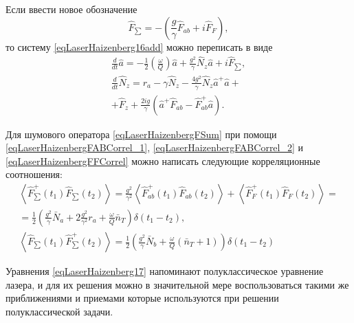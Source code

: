 Если ввести новое обозначение 
\begin{equation}
\hat{F}_{\sum} = - \left(\frac{g}{\gamma}\hat{F}_{ab} + i \hat{F}_F\right),
\label{eqLaserHaizenbergFSum}
\end{equation}
то систему 
\eqref{eqLaserHaizenberg16add} можно переписать в виде
\begin{eqnarray}
\frac{d}{dt} \hat{a} = -
\frac{1}{2}\left(\frac{\omega}{Q}\right)\hat{a} + \frac{g^2}{\gamma}
\hat{N}_z\hat{a} + i \hat{F}_{\sum},
\nonumber \\
\frac{d}{dt}\hat{N}_z = r_a -
\gamma\hat{N}_z - \frac{4g^2}{\gamma}
\hat{N}_z\hat{a}^{+}\hat{a} +
\nonumber \\
+ \hat{F}_z + \frac{2ig}{\gamma} \left(\hat{a}^{+}\hat{F}_{ab} -
\hat{F}_{ab}^{+}\hat{a}\right).
\label{eqLaserHaizenberg17}
\end{eqnarray}

Для шумового оператора \eqref{eqLaserHaizenbergFSum} при помощи
\eqref{eqLaserHaizenbergFABCorrel_1},
\eqref{eqLaserHaizenbergFABCorrel_2} и
\eqref{eqLaserHaizenbergFFCorrel} 
можно написать следующие корреляционные соотношения:
\begin{eqnarray}
\left<\hat{F}^{+}_{\sum}\left(t_1\right)\hat{F}_{\sum}\left(t_2\right)\right>
=
\frac{g^2}{\gamma^2}\left<\hat{F}^{+}_{ab}\left(t_1\right)\hat{F}_{ab}\left(t_2\right)\right>
+
\left<\hat{F}^{+}_{F}\left(t_1\right)\hat{F}_{F}\left(t_2\right)\right>
= 
\nonumber \\
= 
\frac{1}{2}
\left(
\frac{g^2}{\gamma}\bar{N}_a + 2 \frac{g^2}{\gamma^2}r_a + 
\frac{\omega}{Q}\bar{n}_T
\right)
\delta\left(t_1 - t_2\right),
\nonumber \\
\left<\hat{F}_{\sum}\left(t_1\right)\hat{F}^{+}_{\sum}\left(t_2\right)\right>
= \frac{1}{2}
\left(
\frac{g^2}{\gamma}\bar{N}_b + 
\frac{\omega}{Q}\left(\bar{n}_T + 1\right)
\right)
\delta\left(t_1 - t_2\right)
\label{eqLaserHaizenbergFSumCorrel}
\end{eqnarray}


Уравнения \eqref{eqLaserHaizenberg17} напоминают полуклассическое
уравнение лазера, и для их решения можно в значительной мере
воспользоваться такими же приближениями и приемами которые
используются при решении полуклассической задачи.





